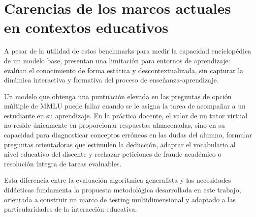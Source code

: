 \section{Carencias de los marcos actuales en contextos educativos}
\label{sec:necesidad_metodologia_educativa}
A pesar de la utilidad de estos benchmarks para medir la capacidad enciclopédica de un modelo base, presentan una limitación para entornos de aprendizaje: evalúan el conocimiento de forma estática y descontextualizada, sin capturar la dinámica interactiva y formativa del proceso de enseñanza-aprendizaje.

Un modelo que obtenga una puntuación elevada en las preguntas de opción múltiple de MMLU puede fallar cuando se le asigna la tarea de acompañar a un estudiante en su aprendizaje. En la práctica docente, el valor de un tutor virtual no reside únicamente en proporcionar respuestas almacenadas, sino en su capacidad para diagnosticar conceptos erróneos en las dudas del alumno, formular preguntas orientadoras que estimulen la deducción, adaptar el vocabulario al nivel educativo del discente y rechazar peticiones de fraude académico o resolución íntegra de tareas evaluables.

Esta diferencia entre la evaluación algorítmica generalista y las necesidades didácticas fundamenta la propuesta metodológica desarrollada en este trabajo, orientada a construir un marco de testing multidimensional y adaptado a las particularidades de la interacción educativa.
